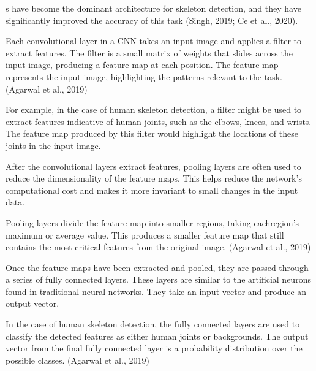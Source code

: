 \CNN\-s have become the dominant architecture for skeleton detection, and they have significantly improved the accuracy of this task (\scc Singh, 2019; \scc Ce et al., 2020).



Each convolutional layer in a CNN takes an input image and applies a filter to extract features. The filter is a small matrix of weights that slides across the input image, producing a feature map at each position. The feature map represents the input image, highlighting the patterns relevant to the task. (\scc Agarwal et al., 2019)

For example, in the case of human skeleton detection, a filter might be used to extract features indicative of human joints, such as the elbows, knees, and wrists. The feature map produced by this filter would highlight the locations of these joints in the input image.


After the convolutional layers extract features, pooling layers are often used to reduce the dimensionality of the feature maps. This helps reduce the network's computational cost and makes it more invariant to small changes in the input data.

Pooling layers divide the feature map into smaller regions, taking each\break region's maximum or average value. This produces a smaller feature map that still contains the most critical features from the original image. (\scc Agarwal et al., 2019)


Once the feature maps have been extracted and pooled, they are passed through a series of fully connected layers. These layers are similar to the artificial neurons found in traditional neural networks. They take an input vector and produce an output vector.

In the case of human skeleton detection, the fully connected layers are used to classify the detected features as either human joints or backgrounds. The output vector from the final fully connected layer is a probability distribution over the possible classes. (\scc Agarwal et al., 2019)

